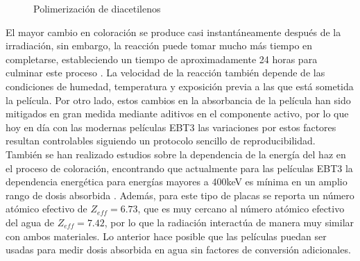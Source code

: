 \begin{figure}[H]
	\centering
	\hfill
	\caption{Polimerización de diacetilenos}
\end{figure}

El mayor cambio en coloración se produce casi instantáneamente después de la irradiación, sin embargo, la reacción puede tomar mucho más tiempo en completarse, estableciendo un tiempo de aproximadamente 24 horas para culminar este proceso \cite{Williams2011}. La velocidad de la reacción también depende de las condiciones de humedad\cite{LenMarroqun2018}, temperatura \cite{Rink2008} y exposición previa a las que está sometida la película\cite{NiroomandRad1998}. Por otro lado, estos cambios en la absorbancia de la película han sido mitigados en gran medida mediante aditivos en el componente activo, por lo que hoy en día con las modernas películas EBT3 las variaciones por estos factores resultan controlables siguiendo un protocolo sencillo de reproducibilidad. \\

También se han realizado estudios sobre la dependencia de la energía del haz en el proceso de coloración, encontrando que actualmente para las películas EBT3 la dependencia energética para energías mayores a 400keV es mínima en un amplio rango de dosis absorbida\cite{Chemiski2010} . Además, para este tipo de placas se reporta un número atómico efectivo de $Z_{eff}=6.73$, que es muy cercano al número atómico efectivo del agua de $Z_{eff}=7.42$, por lo que la radiación interactúa de manera muy similar con ambos materiales. Lo anterior hace posible que las películas puedan ser usadas para medir dosis absorbida en agua sin factores de conversión adicionales.\\

